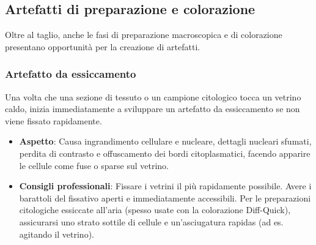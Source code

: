 \subsection{Artefatti di preparazione e colorazione}

Oltre al taglio, anche le fasi di preparazione macroscopica e di colorazione presentano opportunità per la creazione di artefatti. 

\subsubsection{Artefatto da essiccamento}
Una volta che una sezione di tessuto o un campione citologico tocca un vetrino caldo, inizia immediatamente a sviluppare un artefatto da essiccamento se non viene fissato rapidamente. 
\begin{itemize}
    \item   \textbf{Aspetto}: Causa ingrandimento cellulare e nucleare, dettagli nucleari sfumati, perdita di contrasto e offuscamento dei bordi citoplasmatici, facendo apparire le cellule come fuse o sparse sul vetrino. 
    \item   \textbf{Consigli professionali}: Fissare i vetrini il più rapidamente possibile. Avere i barattoli del fissativo aperti e immediatamente accessibili.  Per le preparazioni citologiche essiccate all'aria (spesso usate con la colorazione Diff-Quick), assicurarsi uno strato sottile di cellule e un'asciugatura rapidas (ad es. agitando il vetrino). 
\end{itemize}

